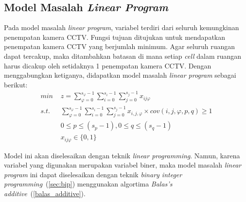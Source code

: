 \subsection{Model Masalah \textit{Linear Program}}
Pada model masalah \textit{linear program}, variabel terdiri dari seluruh kemungkinan penempatan kamera CCTV. Fungsi tujuan ditujukan untuk mendapatkan penempatan kamera CCTV yang berjumlah minimum. Agar seluruh ruangan dapat tercakup, maka ditambahkan batasan di mana setiap \textit{cell} dalam ruangan harus dicakup oleh setidaknya 1 penempatan kamera CCTV. Dengan menggabungkan ketiganya, didapatkan model masalah \textit{linear program} sebagai berikut:
\begin{equation}
	\begin{split}
		\textit{min } & z = \sum_{\varphi=0}^{s_{\varphi}-1} \sum_{i=0}^{s_i-1} \sum_{j=0}^{s_j-1} x_{ij\varphi}\\
		\textit{s.t. } & \sum_{\varphi=0}^{s_{\varphi}-1} \sum_{i=0}^{s_i-1} \sum_{j=0}^{s_j-1} x_{i,j,\varphi} \times cov(i,j,\varphi,p,q) \geq 1\\
		& 0 \leq p \leq (s_p - 1), 0 \leq q \leq (s_q - 1)\\
		& x_{ij\varphi} \in \{0,1\}
	\end{split}
\end{equation}

Model ini akan diselesaikan dengan teknik \textit{linear programming}. Namun, karena variabel yang digunakan merupakan variabel biner, maka model masalah \textit{linear program} ini dapat diselesaikan dengan teknik \textit{binary integer programming}~(\ref{sec:bip}) menggunakan algortima \textit{Balas's additive}~(\ref{balas_additive}).


